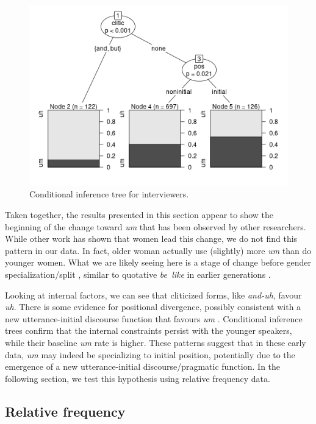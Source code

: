 \documentclass[11pt]{article}
\begin{document}
\begin{figure}[htpb]
    \centering
    \includegraphics[width=0.8\linewidth]{figures/ctreeinterviewers.png}
    \caption{Conditional inference tree for interviewers.}
    \label{fig:interviewertree}
\end{figure}

Taken together, the results presented in this section appear to show the
beginning of the change toward \emph{um} that has been observed by other
researchers.
While other work has shown that women lead this change, we do not find this
pattern in our data.
In fact, older woman actually use (slightly) more \emph{um} than do younger
women.
What we are likely seeing here is a stage of change before gender
specialization/split \parencite[308]{labov2001social}, similar to quotative
\emph{be~like} in earlier generations
\parencite[208--209]{tagliamontedarcy2007}.

Looking at internal factors, we can see that cliticized forms, like
\emph{and-uh}, favour \emph{uh}.
There is some evidence for positional divergence, possibly consistent with a new
utterance-initial discourse function that favours \emph{um}
\parencite[cf.][, who found no turn-positional difference]{fruehwald2016}.
Conditional inference trees confirm that the internal constraints persist with
the younger speakers, while their baseline \emph{um} rate is higher.
These patterns suggest that in these early data, \emph{um} may indeed be
specializing to initial position, potentially due to the emergence of a new
utterance-initial discourse/pragmatic function.
In the following section, we test this hypothesis using relative frequency data.

\subsection{Relative frequency}
\end{document}
